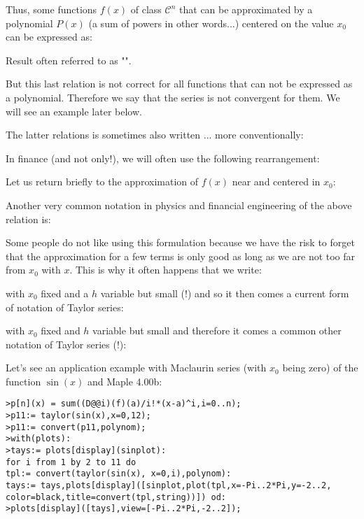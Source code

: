 	Thus, some functions $f (x)$ of class $\mathcal{C}^n$ that can be approximated by a polynomial $P(x)$ (a sum of powers in other words...) centered on the value $x_0$ can be expressed as:
	
	Result often referred to as "".
	
	But this last relation is not correct for all functions that can not be expressed as a polynomial. Therefore we say that the series is not convergent for them. We will see an example later below.
	
	The latter relations is sometimes also written ... more conventionally:
	
	In finance (and not only!), we will often use the following rearrangement:
	
	Let us return briefly to the approximation of $f (x)$ near and centered in $x_0$:
	
	Another very common notation in physics and financial engineering of the above relation is\label{differential expression of Taylor series}:
	
	Some people do not like using this formulation because we have the risk to forget that the approximation for a few terms is only good as long as we are not too far from $x_0$ with $x$. This is why it often happens that we write:
	
	with $x_0$ fixed and a $h$ variable but small (!) and so it then comes a current form of notation of Taylor series:
	
	with $x_0$ fixed and $h$ variable but small and therefore it comes a common other notation of Taylor series (!):
	
	Let's see an application example with Maclaurin series (with $x_0$ being zero) of the function $\sin (x)$ and Maple 4.00b:
	
	\texttt{>p[n](x) = sum((D@@i)(f)(a)/i!*(x-a)\string^i,i=0..n);\\
	>p11:= taylor(sin(x),x=0,12);\\
	>p11:= convert(p11,polynom);\\
	>with(plots):\\
	>tays:= plots[display](sinplot):\\
	for i from 1 by 2 to 11 do\\
	tpl:= convert(taylor(sin(x), x=0,i),polynom):\\
	tays:= tays,plots[display]([sinplot,plot(tpl,x=-Pi..2*Pi,y=-2..2,\\
	color=black,title=convert(tpl,string))]) od: \\
	>plots[display]([tays],view=[-Pi..2*Pi,-2..2]);}

